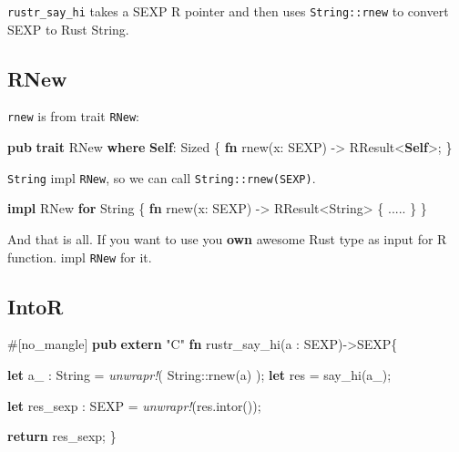 \documentclass[]{book}
\newenvironment{Shaded}{\begin{snugshade}}{\end{snugshade}}
\newcommand{\KeywordTok}[1]{\textcolor[rgb]{0.13,0.29,0.53}{\textbf{{#1}}}}
\newcommand{\DataTypeTok}[1]{\textcolor[rgb]{0.13,0.29,0.53}{{#1}}}
\newcommand{\StringTok}[1]{\textcolor[rgb]{0.31,0.60,0.02}{{#1}}}
\newcommand{\BuiltInTok}[1]{{#1}}
\newcommand{\PreprocessorTok}[1]{\textcolor[rgb]{0.56,0.35,0.01}{\textit{{#1}}}}
\newcommand{\AttributeTok}[1]{\textcolor[rgb]{0.77,0.63,0.00}{{#1}}}
\newcommand{\NormalTok}[1]{{#1}}
\begin{document}
\texttt{rustr\_say\_hi} takes a SEXP R pointer and then uses
\texttt{String::rnew} to convert SEXP to Rust String.

\subsection{RNew}\label{rnew}

\texttt{rnew} is from trait \texttt{RNew}:

\begin{Shaded}
\begin{Highlighting}[]
\KeywordTok{pub} \KeywordTok{trait} \NormalTok{RNew }\KeywordTok{where} \KeywordTok{Self}\NormalTok{: }\BuiltInTok{Sized}
\NormalTok{\{}
    \KeywordTok{fn} \NormalTok{rnew(x: SEXP) -> RResult<}\KeywordTok{Self}\NormalTok{>;}
\NormalTok{\}}
\end{Highlighting}
\end{Shaded}

\texttt{String} impl \texttt{RNew}, so we can call
\texttt{String::rnew(SEXP)}.

\begin{Shaded}
\begin{Highlighting}[]
\KeywordTok{impl} \NormalTok{RNew }\KeywordTok{for} \DataTypeTok{String} \NormalTok{\{}
    \KeywordTok{fn} \NormalTok{rnew(x: SEXP) -> RResult<}\DataTypeTok{String}\NormalTok{> \{}
        \NormalTok{.....}
    \NormalTok{\}}
\NormalTok{\}}
\end{Highlighting}
\end{Shaded}

And that is all. If you want to use you \textbf{own} awesome Rust type
as input for R function. impl \texttt{RNew} for it.

\subsection{IntoR}\label{intor}

\begin{Shaded}
\begin{Highlighting}[]
\AttributeTok{#[}\NormalTok{no_mangle}\AttributeTok{]}
\KeywordTok{pub} \KeywordTok{extern} \StringTok{"C"} \KeywordTok{fn} \NormalTok{rustr_say_hi(a : SEXP)->SEXP\{}

 \KeywordTok{let} \NormalTok{a_ : }\DataTypeTok{String} \NormalTok{= }\PreprocessorTok{unwrapr!}\NormalTok{( }\DataTypeTok{String}\NormalTok{::rnew(a) );}
 \KeywordTok{let} \NormalTok{res  = say_hi(a_);}

 \KeywordTok{let} \NormalTok{res_sexp : SEXP = }\PreprocessorTok{unwrapr!}\NormalTok{(res.intor());}

 \KeywordTok{return} \NormalTok{res_sexp;}
\NormalTok{\}}
\end{Highlighting}
\end{Shaded}
\end{document}
